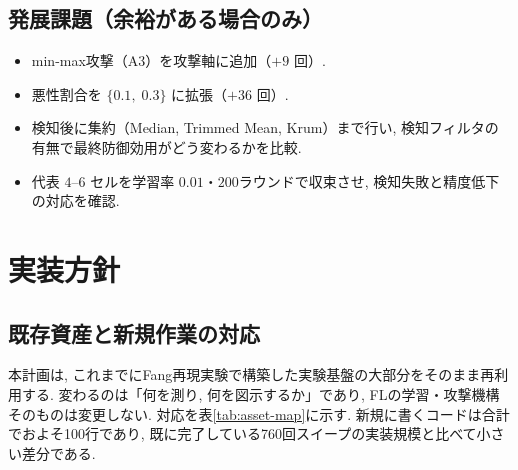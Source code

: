 \documentclass[a4j, twocolumn, dvipdfmx]{jsarticle}
\begin{document}
\subsection{発展課題（余裕がある場合のみ）}

\begin{itemize}
  \item min-max攻撃（A3）を攻撃軸に追加（$+9$ 回）.
  \item 悪性割合を $\{0.1,\; 0.3\}$ に拡張（$+36$ 回）.
  \item 検知後に集約（Median, Trimmed Mean, Krum）まで行い, 検知フィルタの有無で最終防御効用がどう変わるかを比較.
  \item 代表 $4$--$6$ セルを学習率 $0.01$・$200$ラウンドで収束させ, 検知失敗と精度低下の対応を確認.
\end{itemize}

\section{実装方針}

\subsection{既存資産と新規作業の対応}
\label{sec:asset-map}

本計画は, これまでにFang再現実験で構築した実験基盤の大部分をそのまま再利用する. 変わるのは「何を測り, 何を図示するか」であり, FLの学習・攻撃機構そのものは変更しない. 対応を表\ref{tab:asset-map}に示す. 新規に書くコードは合計でおよそ100行であり, 既に完了している760回スイープの実装規模と比べて小さい差分である.
\end{document}

